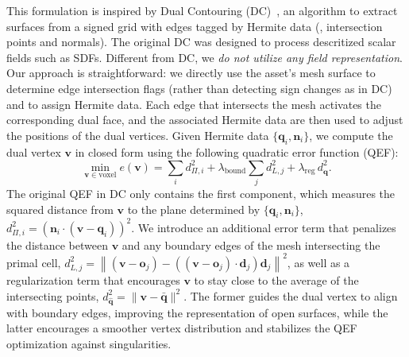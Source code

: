 \documentclass[10pt,twocolumn,letterpaper]{article}
\begin{document}
This formulation is inspired by Dual Contouring (DC)~\cite{ju2002dual,chen2022neural}, an algorithm to extract surfaces from a signed grid with edges tagged by Hermite data (\ie, intersection
points and normals).
The original DC was designed to process descritized scalar fields such as SDFs. Different from DC, we \emph{do not utilize any field representation}. Our approach is straightforward: we directly use the asset’s mesh surface to determine edge intersection flags (rather than detecting sign changes as in DC) and to assign Hermite data. Each edge that intersects the mesh activates the corresponding dual face, and the associated Hermite data are then used to adjust the positions of the dual vertices. Given Hermite data $\{\boldsymbol{q}_i, \boldsymbol{n}_i\}$, we compute the dual vertex $\boldsymbol{v}$ in closed form using the following quadratic error function (QEF):
\begin{equation}\label{eq:qef}
\min_{\boldsymbol{v}\in\text{voxel}} e(\boldsymbol{v}) =
\sum_i d_{\Pi,i}^2
+ \lambda_{\text{bound}} \sum_j d_{L,j}^2
+ \lambda_{\text{reg}}\, d_{\hat{\boldsymbol{q}}}^2.
\end{equation}
The original QEF in DC only contains the first component, which measures the squared distance from $\boldsymbol{v}$ to the plane determined by $\{\boldsymbol{q}_i,\boldsymbol{n}_i\}$, $d_{\Pi,i}^2=(\boldsymbol{n}_i\cdot(\boldsymbol{v}-\boldsymbol{q}_i))^2$. We introduce an additional error term that penalizes the distance between 
$\boldsymbol{v}$ and any boundary edges of the mesh intersecting the primal cell, $d_{L,j}^2 = \left\| (\boldsymbol{v} - \boldsymbol{o}_j) - ((\boldsymbol{v} - \boldsymbol{o}_j) \cdot \boldsymbol{d}_j)\boldsymbol{d}_j \right\|^2$, 
as well as a regularization term that encourages $\boldsymbol{v}$ to stay close 
to the average of the intersecting points, $d_{\hat{\boldsymbol{q}}}^2 = \|\boldsymbol{v} - \bar{\boldsymbol{q}}\|^2$. 
The former guides the dual vertex to align with boundary edges, improving the representation of open surfaces, while the latter encourages a smoother vertex distribution and stabilizes the QEF optimization against singularities.
\end{document}
